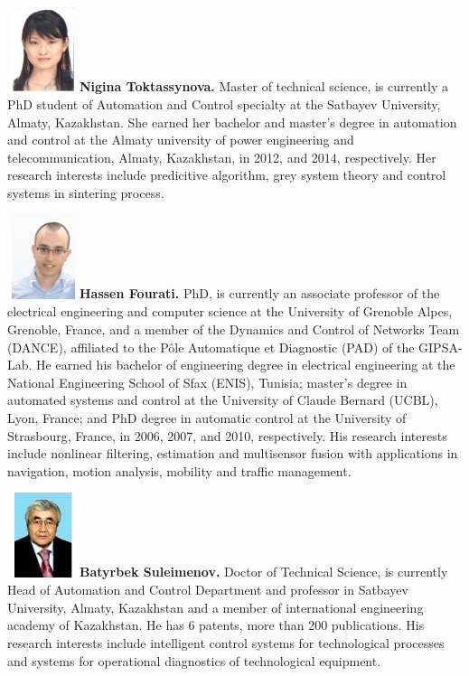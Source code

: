 \documentclass[AMS,STIX2COL]{WileyNJD-v2}
\begin{document}
\begin{biography}{\includegraphics[width=60pt,height=70pt]{7.jpg}}{\textbf{Nigina Toktassynova.} Master of technical science, is currently a PhD student of Automation and Control specialty at the Satbayev University, Almaty, Kazakhstan. She earned her bachelor and master’s degree in automation and control at the Almaty university of power engineering and telecommunication, Almaty, Kazakhstan, in 2012, and 2014, respectively. Her research interests include predicitive algorithm, grey system theory and control systems in sintering process. }
\end{biography}
\begin{biography}{\includegraphics[width=60pt,height=70pt]{8.jpg}}{\textbf{Hassen Fourati.} PhD, is currently an associate professor of the electrical engineering and computer science at the University of Grenoble Alpes, Grenoble, France, and a member of the Dynamics and Control of Networks Team (DANCE), affiliated to the Pôle Automatique et Diagnostic (PAD) of the GIPSA-Lab. He earned his bachelor of engineering degree in electrical engineering at the National Engineering School of Sfax (ENIS), Tunisia; master’s degree in automated systems and control at the University of Claude Bernard (UCBL), Lyon, France; and PhD degree in automatic control at the University of Strasbourg, France, in 2006, 2007, and 2010, respectively. His research interests include nonlinear filtering, estimation and multisensor fusion with applications in navigation, motion analysis, mobility and traffic management.}
\end{biography}
\begin{biography}{\includegraphics[width=60pt,height=70pt]{9.jpg}}{\textbf{Batyrbek Suleimenov.} Doctor of Technical Science, is currently Head of Automation and Control Department and professor in Satbayev University, Almaty, Kazakhstan and a member of international engineering academy of Kazakhstan. He has 6 patents, more than 200 publications. His research interests include intelligent control systems for technological processes and systems for operational diagnostics of technological equipment.}
\end{biography}
\end{document}
